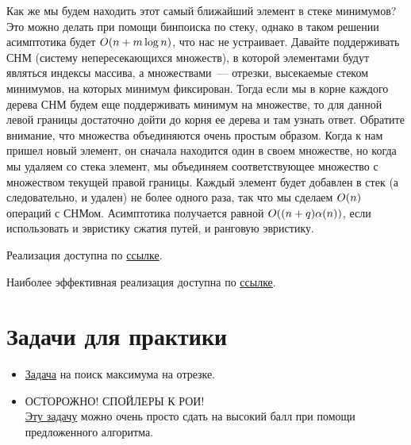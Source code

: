 Как же мы будем находить этот самый ближайший элемент в стеке минимумов? Это можно делать при помощи бинпоиска по стеку, однако в таком решении асимптотика будет $O(n + m \log n)$, что нас не устраивает. Давайте поддерживать СНМ (систему непересекающихся множеств), в которой элементами будут являться индексы массива, а множествами~--- отрезки, высекаемые стеком минимумов, на которых минимум фиксирован. Тогда если мы в корне каждого дерева СНМ будем еще поддерживать минимум на множестве, то для данной левой границы достаточно дойти до корня ее дерева и там узнать ответ. Обратите внимание, что множества объединяются очень простым образом. Когда к нам пришел новый элемент, он сначала находится один в своем множестве, но когда мы удаляем со стека элемент, мы объединяем соответствующее множество с множеством текущей правой границы. Каждый элемент будет добавлен в стек (а следовательно, и удален) не более одного раза, так что мы сделаем $O(n)$ операций с СНМом. Асимптотика получается равной $O((n + q) \alpha(n))$, если использовать и эвристику сжатия путей, и ранговую эвристику.

Реализация доступна по \href{https://pastebin.com/WaGMprcc}{ссылке}.

Наиболее эффективная реализация доступна по \href{https://pastebin.com/QQqptmFm}{ссылке}.

\section{Задачи для практики}

\begin{itemize}
    \item \href{https://informatics.msk.ru/mod/statements/view.php?id=597&chapterid=752#1}{Задача} на поиск максимума на отрезке.

    \item ОСТОРОЖНО! СПОЙЛЕРЫ К РОИ! \\ \href{https://contest.yandex.ru/roiarchive/contest/4284/problems/7/}{Эту задачу} можно очень просто сдать на высокий балл при помощи предложенного алгоритма.   
\end{itemize}


